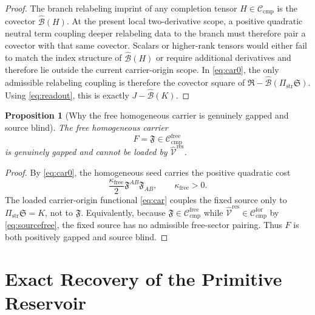 \documentclass[11pt]{article}
\newcommand{\ResidualLift}{\widehat{\mathcal V}^{\mathrm{res}}}
\newcommand{\SubGaugeVec}{\widehat{\mathcal B}}
\newcommand{\CompClass}{\mathscr C_{\mathrm{cmp}}}
\newcommand{\CompFree}{\mathscr C_{\mathrm{cmp}}^{\mathrm{free}}}
\newcommand{\CompForced}{\mathscr C_{\mathrm{cmp}}^{\mathrm{for}}}
\newcommand{\FreeStiff}{\kappa_{\mathrm{free}}}
\newcommand{\PrimStrain}{K}
\newcommand{\PrimNeutral}{J}
\newcommand{\PrimFree}{F}
\newcommand{\CarrierProj}{\Pi_{\mathrm{str}}}
\newcommand{\CarrierSeed}{\mathfrak S}
\newcommand{\RelabelSeed}{\mathfrak R}
\newcommand{\FreeSeed}{\mathfrak F}
\newtheorem{proposition}{Proposition}
\begin{document}
\begin{proof}
The branch relabeling imprint of any completion tensor \(H\in\CompClass\) is the covector \(\SubGaugeVec(H)\). At the present local two-derivative scope, a positive quadratic neutral term coupling deeper relabeling data to the branch must therefore pair a covector with that same covector. Scalars or higher-rank tensors would either fail to match the index structure of \(\SubGaugeVec(H)\) or require additional derivatives and therefore lie outside the current carrier-origin scope. In \eqref{eq:car0}, the only admissible relabeling coupling is therefore the covector square of \(\RelabelSeed-\SubGaugeVec(\CarrierProj\CarrierSeed)\). Using \eqref{eq:readout}, this is exactly \(\PrimNeutral-\SubGaugeVec(\PrimStrain)\).
\end{proof}

\begin{proposition}[Why the free homogeneous carrier is genuinely gapped and source blind]
\label{prop:free}
The free homogeneous carrier
\[
\PrimFree=\FreeSeed\in\CompFree
\]
is genuinely gapped and cannot be loaded by \(\ResidualLift\).
\end{proposition}

\begin{proof}
By \eqref{eq:car0}, the homogeneous seed carries the positive quadratic cost
\[
\frac{\FreeStiff}{2}\FreeSeed^{AB}\FreeSeed_{AB},
\qquad
\FreeStiff>0.
\]
The loaded carrier-origin functional \eqref{eq:car} couples the fixed source only to \(\CarrierProj\CarrierSeed=\PrimStrain\), not to \(\FreeSeed\). Equivalently, because \(\FreeSeed\in\CompFree\) while \(\ResidualLift\in\CompForced\) by \eqref{eq:sourcefree}, the fixed source has no admissible free-sector pairing. Thus \(\PrimFree\) is both positively gapped and source blind.
\end{proof}

\section{Exact Recovery of the Primitive Reservoir}
\end{document}
